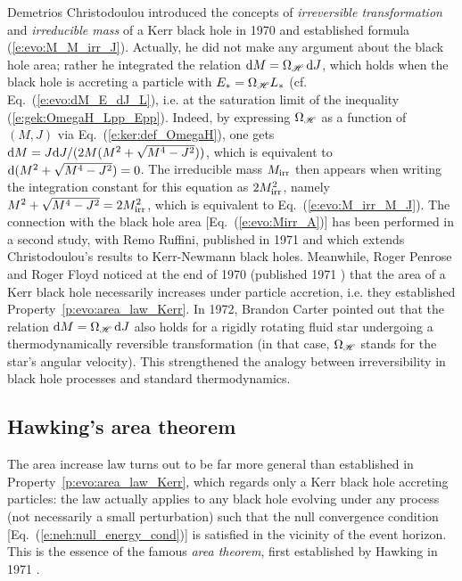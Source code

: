 \begin{hist}
\label{h:evo:irreducible_mass}
Demetrios Christodoulou introduced the
concepts of \emph{irreversible transformation} and \emph{irreducible mass} of a Kerr black
hole in 1970 \cite{Chris70} and established formula (\ref{e:evo:M_M_irr_J}).
Actually, he did not make any argument about the black hole area; rather he
integrated the relation $\mathrm{d} M = \Omega_{\mathscr{H}} \, \mathrm{d} J$, which holds when
the black hole is accreting a particle with $E_* = \Omega_{\mathscr{H}} L_*$ (cf. Eq.~(\ref{e:evo:dM_E_dJ_L}), i.e.
at the saturation limit of the inequality (\ref{e:gek:OmegaH_Lpp_Epp}). Indeed, by expressing
$\Omega_{\mathscr{H}}$ as a function of $(M,J)$ via Eq.~(\ref{e:ker:def_OmegaH}),
one gets $\mathrm{d} M = J\mathrm{d} J/(2M(M^2 + \sqrt{M^4 - J^2}))$, which is equivalent
to $\mathrm{d}(M^2 + \sqrt{M^4 - J^2}) = 0$.
The irreducible mass $M_{\rm irr}$
then appears when writing the integration constant for this equation as $2 M_{\rm irr}^2$,
namely $M^2 + \sqrt{M^4 - J^2} = 2 M_{\rm irr}^2$, which is equivalent to Eq.~(\ref{e:evo:M_irr_M_J}).
The connection with the black hole area [Eq.~(\ref{e:evo:Mirr_A})] has been
performed in a second study, with Remo Ruffini, published in 1971
\cite{ChrisR71} and which extends Christodoulou's results to Kerr-Newmann
black holes. Meanwhile,
Roger Penrose
and Roger Floyd noticed at the end of 1970 (published 1971 \cite{PenroF71})
that the area of a Kerr black hole necessarily increases under particle accretion, i.e.
they established Property~\ref{p:evo:area_law_Kerr}.
In 1972, Brandon Carter \cite{Carte72} pointed out that the relation
$\mathrm{d} M = \Omega_{\mathscr{H}} \, \mathrm{d} J$ also holds for a rigidly rotating fluid star undergoing a
thermodynamically reversible transformation (in that case, $\Omega_{\mathscr{H}}$ stands for
the star's angular velocity). This strengthened the analogy between irreversibility in
black hole processes and standard thermodynamics.
\end{hist}

\subsection{Hawking's area theorem}

The area increase law turns out to be far
more general than established in Property~\ref{p:evo:area_law_Kerr},
which regards only a Kerr black hole accreting particles:
the law actually applies to any black hole evolving under
any process (not necessarily a small perturbation) such that the null convergence condition
[Eq.~(\ref{e:neh:null_energy_cond})]
is satisfied in the vicinity of the event horizon.
This is the essence of the famous \emph{area theorem}, first established
by Hawking in 1971 \cite{Hawki71}.

